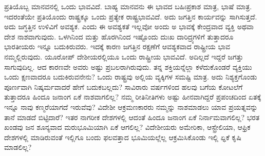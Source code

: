 ಪ್ರತಿಯೊಬ್ಬ ಮಾನವನಲ್ಲಿ ಒಂದು ಭಾವವಿದೆ. ಬಾಹ್ಯ ಮಾನವನು ಈ ಭಾವದ ಬಹಿಃಪ್ರಕಾಶ ಮಾತ್ರ, ಭಾಷೆ ಮಾತ್ರ. ಇದರಂತೆಯೇ ಪ್ರತಿಯೊಂದು ರಾಷ್ಟ್ರಕ್ಕೂ ಒಂದು ಪ್ರತ್ಯೇಕ ರಾಷ್ಟ್ರಭಾವವಿದೆ. ಅದು ಜಗತ್ತಿನ ಕಾರ್ಯವನ್ನು ಸಾಗಿಸುತ್ತದೆ. ಅದು ಜಗ್ಧತ್ತಿನ ಉಳಿವಿಗೆ ಅವಶ್ಯಕ. ಎಂದು ಈ ಅವಶ್ಯಕತೆ ಇಲ್ಲವೋ ಅಂದು ಅ ಭಾವಕ್ಕೆ ಕೇಂದ್ರವಾದ ವ್ಯಕ್ತಿ ಅಥವಾ ದೇಶ ನಾಶವಾಗುವುದು. ಒಳಗಿನಿಂದ ಮತ್ತು ಹೊರಗಿನಿಂದ ಇಷ್ಟೊಂದು ದುಃಖ ದಾರಿದ್ರ್ಯಗಳಿಗೆ ತುತ್ತಾದರೂ ಭಾರತೀಯರು ಇನ್ನೂ ಬದುಕಿರುವರು. ಇದಕ್ಕೆ ಕಾರಣ ಜಗತ್ತಿನ ರಕ್ಷಣೆಗೆ ಆವಶ್ಯಕವಾದ ರಾಷ್ಟ್ರೀಯ ಭಾವ ನಮ್ಮಲ್ಲಿರುವುದು. ಯೂರೋಪ್​ ದೇಶೀಯರಲ್ಲಿಯೂ ಒಂದು ರಾಷ್ಟ್ರೀಯ ಭಾವವಿದೆ. ಅದಿಲ್ಲದೆ ಇದ್ದರೆ ಜಗತ್ತು ಸಾಗುವುದಿಲ್ಲ. ಆದ ಕಾರಣವೇ ಅವರು ಅಷ್ಟು ಪ್ರಬಲರಾಗಿರುವುದು. ತನ್ನ ಶಕ್ತಿಯನ್ನೆಲ್ಲಾ ಕಳೆದುಕೊಂಡರೆ ವ್ಯಕ್ತಿಯು ಒಂದು ಕ್ಷಣವಾದರೂ ಬದುಕಿರುವನೇನು? ಒಂದು ರಾಷ್ಟ್ರವು ಅಲ್ಲಿಯ ವ್ಯಕ್ಕಿಗಳ ಸಮಷ್ಟಿ ಮಾತ್ರ. ಅದು ನಿಶ್ಯಕ್ತಗೊಂಡು ಪೂರ್ಣವಾಗಿ ನಿಷ್ಕರ್ಮವಾದರೆ ಹೇಗೆ ಬದುಕಬಲ್ಲದು? ಸಾವಿರಾರು ವರ್ಷಗಳಿಂದ ಹಲವು ಬಗೆಯ ಕೋಟಲೆಗೆ ತುತ್ತಾದರೂ ಹಿಂದೂ ಜನಾಂಗ ಏಕೆ ನಾಶವಾಗಲಿಲ್ಲ? ನಮ್ಮ ರೀತಿನೀತಿಗಳು ಅಷ್ಟು ಹೀನವಾಗಿದ್ದರೆ ಪ್ರಪಂಚದಿಂದ ಏತಕ್ಕೆ ಇನ್ನೂ ನಾವು ಕಣ್ಮರೆಯಾಗದೆ ಇರುವೆವು? ವಿದೇಶೀ ಆಕ್ರಮಣಕಾರರು ನಮ್ಮನ್ನು ನಾಶಮಾಡಲು ಯಾವ ಪ್ರಯತ್ನವನ್ನು ತಾನೆ ಮಾಡದೆ ಬಿಟ್ಟಿದಾರೆ? ಇತರ ನಾಗರೀಕ ದೇಶಗಳಲ್ಲಿ ಆದಂತೆ ಹಿಂದೂ ಜನಾಂಗ ಏಕೆ ನಿರ್ನಾಮವಾಗಲಿಲ್ಲ? ಭರತ ಖಂಡವು ಜನ ಶೂನ್ಯವಾದ ಮರುಭೂಮಿಯಾಗಿ ಏಕೆ ಆಗಲಿಲ್ಲ? ವಿದೇಶೀಯರು ಅಮೇರಿಕಾ, ಆಸ್ಟ್ರೇಲಿಯಾ, ಆಫ್ರಿಕ ದೇಶಗಳಲ್ಲಿ ಮಾಡಿರುವಂತೆ ಇಲ್ಲಿಗೂ ಬಂದು ಫಲವತ್ತಾದ ಭೂಮಿಯಲ್ಲೆಲ್ಲ ಆಕ್ರಮಿಸಿಕೊಂಡು ಇಲ್ಲಿ ಏ್ಧಕೆ ಕೃಷಿ ಮಾಡಲಿಲ್ಲ?

